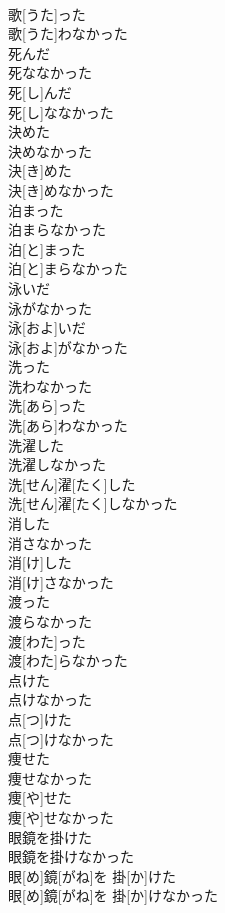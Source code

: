 \documentclass[8pt]{extreport}
\begin{document}
\begin{CJK}{UTF8}{min}
\\	歌[うた]った 
\\	歌[うた]わなかった
\\	死んだ 
\\	死ななかった	
\\	死[し]んだ 
\\	死[し]ななかった
\\	決めた 
\\	決めなかった	
\\	決[き]めた 
\\	決[き]めなかった
\\	泊まった 
\\	泊まらなかった	
\\	泊[と]まった 
\\	泊[と]まらなかった
\\	泳いだ 
\\	泳がなかった	
\\	泳[およ]いだ 
\\	泳[およ]がなかった
\\	洗った 
\\	洗わなかった	
\\	洗[あら]った 
\\	洗[あら]わなかった
\\	洗濯した 
\\	洗濯しなかった	
\\	洗[せん]濯[たく]した 
\\	洗[せん]濯[たく]しなかった
\\	消した 
\\	消さなかった	
\\	消[け]した 
\\	消[け]さなかった
\\	渡った 
\\	渡らなかった	
\\	渡[わた]った 
\\	渡[わた]らなかった
\\	点けた 
\\	点けなかった	
\\	点[つ]けた 
\\	点[つ]けなかった
\\	痩せた 
\\	痩せなかった	
\\	痩[や]せた 
\\	痩[や]せなかった
\\	眼鏡を掛けた 
\\	眼鏡を掛けなかった	
\\	眼[め]鏡[がね]を 掛[か]けた 
\\	眼[め]鏡[がね]を 掛[か]けなかった

\end{CJK}
\end{document}
